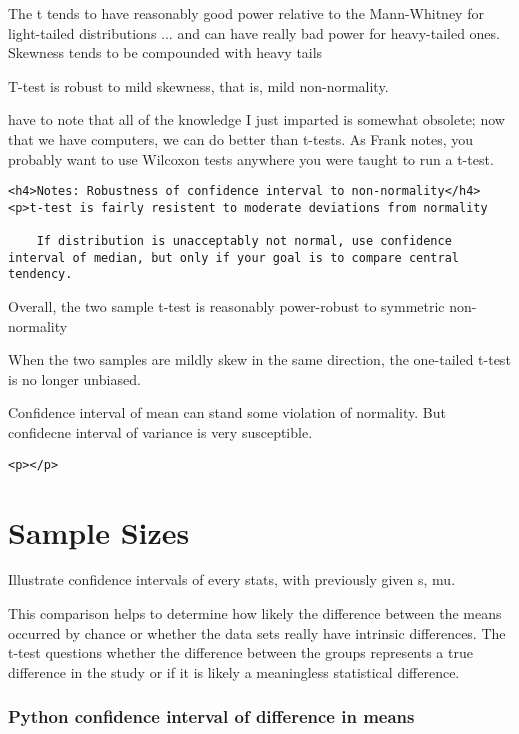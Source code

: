 \documentclass[11pt]{article}
\begin{document}
The t tends to have reasonably good power relative to the Mann-Whitney
for light-tailed distributions ... and can have really bad power for
heavy-tailed ones. Skewness tends to be compounded with heavy tails

T-test is robust to mild skewness, that is, mild non-normality.

have to note that all of the knowledge I just imparted is somewhat
obsolete; now that we have computers, we can do better than t-tests. As
Frank notes, you probably want to use Wilcoxon tests anywhere you were
taught to run a t-test.

    \begin{verbatim}
<h4>Notes: Robustness of confidence interval to non-normality</h4>
<p>t-test is fairly resistent to moderate deviations from normality
    
    If distribution is unacceptably not normal, use confidence interval of median, but only if your goal is to compare central tendency. 
\end{verbatim}

Overall, the two sample t-test is reasonably power-robust to symmetric
non-normality

When the two samples are mildly skew in the same direction, the
one-tailed t-test is no longer unbiased.

Confidence interval of mean can stand some violation of normality. But
confidecne interval of variance is very susceptible.

\begin{verbatim}
<p></p>
\end{verbatim}

    \section{Sample Sizes}\label{sample-sizes}

Illustrate confidence intervals of every stats, with previously given s,
mu.

    This comparison helps to determine how likely the difference between the
means occurred by chance or whether the data sets really have intrinsic
differences. The t-test questions whether the difference between the
groups represents a true difference in the study or if it is likely a
meaningless statistical difference.

    \subsubsection{Python confidence interval of difference in
means}\label{python-confidence-interval-of-difference-in-means}
\end{document}
